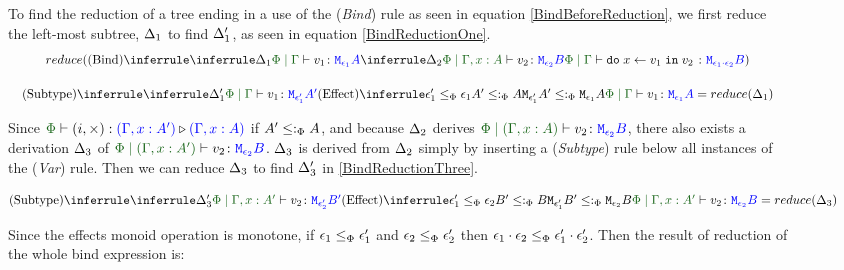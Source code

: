 \documentclass{Report}
\begin{document}
\begin{figure}
\begin{framed}

    To find the reduction of a tree ending in a use of the (\textit{Bind}) rule as seen in equation \ref{BindBeforeReduction}, we first reduce the left-most subtree, $\Delta_1$ to find $\Delta_1'$, as seen in equation \ref{BindReductionOne}.
    \begin{equation}\label{BindBeforeReduction}
        \scalebox{.9}{$
        \reduce(
            \ntreeruleII{Bind}{
                \treeruleI{
                    \D_1
                }{
                    \gpetyperelation{v_1}{\M{\e_1}{A}}
                }
            }{
                \treeruleI{
                    \D_2
                }{
                    \etyperelation{\P}{\gax}{v_2}{\M{\e_2}{B}}
                }
            } {
                \gpetyperelation{\doin{x}{v_1}{v_2}}{\M{\e_1\dot\e_2}{B}}
            }
        )
        $}
    \end{equation}


    \begin{equation}\label{BindReductionOne}
        \scalebox{.9}{$
        \ntreeruleII{Subtype}{
            \treeruleI{\D'_1}{\gpetyperelation{v_1}{\M{\e'_1}{A'}}}
        }{
        \subeffecttree{\e_1'}{A'}{\e_1}{A}
        }{
            \gpetyperelation{v_1}{\M{\e_1}{A}}
        } = \reduce(\D_1)
        $}
    \end{equation}

    Since $\ewrel{\P}{(i,\x)}{(\G, x: A')}{(\gax)}$ if $A' \leq:_\Phi A$, and because $\Delta_2$ derives $\etyperelation{\P}{(\gax)}{v_2}{\M{\e_2}{B}}$, there also exists a derivation $\Delta_3$ of $\etyperelation{\P}{(\G, x: A')}{v_2}{\M{\e_2}{B}}$. $\Delta_3$ is derived from $\Delta_2$ simply by inserting a (\textit{Subtype}) rule below all instances of the (\textit{Var}) rule. Then we can reduce $\Delta_3$ to find $\Delta_3'$ in \ref{BindReductionThree}.

    \begin{equation}\label{BindReductionThree}
        \scalebox{.9}{$
        \ntreeruleII{Subtype}{
            \treeruleI{\D'_3}{\etyperelation{\P}{\G, x: A'}{v_2}{\M{\e'_2}{B'}}}
        }{
        \subeffecttree{\e_1'}{B'}{\e_2}{B}
        }{
            \etyperelation{\P}{\G, x: A'}{v_2}{\M{\e_2}{B}}
        } = \reduce(\D_3)
        $}
    \end{equation}
    

    Since the effects monoid operation is monotone, if $\epsilon_1\leq_{\Phi}\epsilon_1'$ and $\epsilon_2\leq_{\Phi}\epsilon_2'$ then $\epsilon_1\cdot\epsilon_2 \leq_{\Phi} \epsilon_1'\cdot\epsilon_2'$. Then the result of reduction of the whole bind expression is:



\end{framed}
\end{figure}
\end{document}
